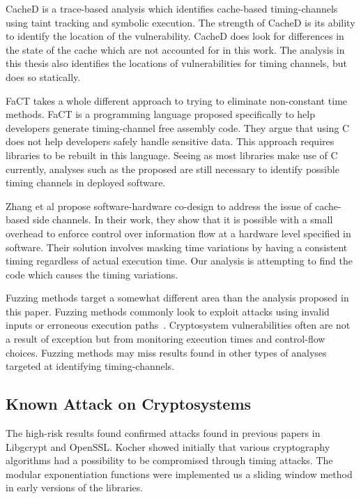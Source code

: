    CacheD is a trace-based analysis which identifies cache-based timing-channels
   using taint tracking and symbolic execution\cite{wang2017cached}. The
   strength of CacheD is its ability to identify the location of the
   vulnerability. CacheD does look for differences in the state of the cache
   which are not accounted for in this work. The analysis in this thesis also
   identifies the locations of vulnerabilities for timing channels, but does so
   statically.

   FaCT takes a whole different approach to trying to eliminate non-constant
   time methods\cite{cauligi2017fact}. FaCT is a programming language proposed
   specifically to help developers generate timing-channel free assembly code.
   They argue that using C does not help developers safely handle sensitive
   data. This approach requires libraries to be rebuilt in this language. Seeing
   as most libraries make use of C currently, analyses such as the proposed are
   still necessary to identify possible timing channels in deployed software.
   
   Zhang et al propose software-hardware co-design to address the issue of
   cache-based side channels\cite{zhang2015hardware}. In their work, they show
   that it is possible with a small overhead to enforce control over information
   flow at a hardware level specified in software. Their solution involves
   masking time variations by having a consistent timing regardless of actual
   execution time. Our analysis is attempting to find the code which causes the
   timing variations.
   
   Fuzzing methods target a somewhat different area than the analysis proposed
   in this paper. Fuzzing methods commonly look to exploit attacks using invalid
   inputs or erroneous execution paths~\cite{sutton2007fuzzing}. Cryptosystem vulnerabilities often are
   not a result of exception but from monitoring execution times and
   control-flow choices. Fuzzing methods may miss results found in other types
   of analyses targeted at identifying timing-channels.
 
\subsection{Known Attack on Cryptosystems}
   The high-risk results found confirmed attacks found in previous papers in
   Libgcrypt and OpenSSL. Kocher showed initially that various cryptography
   algorithms had a possibility to be compromised through timing
   attacks\cite{kochertiming}. The modular exponentiation functions were
   implemented us a sliding window method in early versions of the libraries. 

